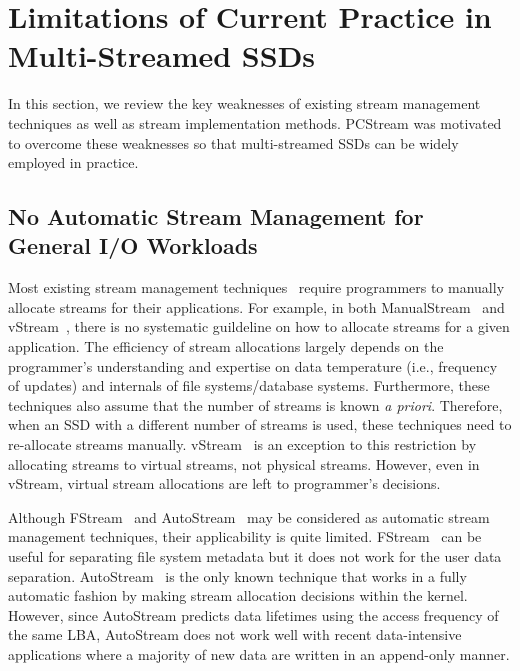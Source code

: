 \section{Limitations of Current Practice in Multi-Streamed SSDs}
In this section, we review the key weaknesses of existing stream management techniques 
as well as stream implementation methods.  
PCStream was motivated to overcome these weaknesses so that multi-streamed
SSDs can be widely employed in practice.

\subsection{No Automatic Stream Management for General I/O Workloads}
Most existing stream management techniques~\cite{MultiStream, Level, vStream} 
require programmers to manually allocate streams for their applications.
For example, 
in both \textsf{\small ManualStream}~\cite{MultiStream} and 
\textsf{\small vStream}~\cite{vStream}, there is no systematic guildeline on how to
allocate streams for a given application. 
The efficiency of stream allocations largely depends on the programmer's 
understanding and expertise on data temperature (i.e., frequency of updates)
and internals of file systems/database systems.
Furthermore, these
techniques also assume that the number of streams is known {\it a priori}.  
Therefore, when an SSD with a different number of streams is used, 
these techniques need to re-allocate streams manually.
\textsf{\small vStream}~\cite{vStream} 
is an exception to this 
restriction by allocating streams to virtual streams, not physical streams.  
However, even in \textsf{\small vStream}, virtual stream allocations are left to
programmer's decisions.

Although \textsf{\small FStream}~\cite{FStream} and \textsf{\small AutoStream}~\cite{AutoStream}
may be considered 
as automatic stream management techniques,
their applicability is quite limited.
\textsf{\small FStream}~\cite{FStream} can be useful for separating file system metadata but it does not
work for the user data separation.
\textsf{\small AutoStream}~\cite{AutoStream} is the only known technique that works in a 
fully automatic fashion by making stream allocation decisions within 
the kernel.
However, since \textsf{\small AutoStream} predicts data lifetimes using the
access frequency of the same LBA, \textsf{\small AutoStream} does not work
well with recent data-intensive 
applications where a majority of
new data are written in an append-only manner.  

